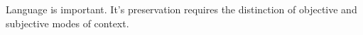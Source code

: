 

Language is important.  It's preservation requires the distinction of
objective and subjective modes of context.

\bye
